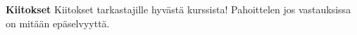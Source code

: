 \documentclass[12pt,a4paper,leqno]{amsart}
\begin{document}
\textbf{Kiitokset}
Kiitokset tarkastajille hyvästä kurssista! Pahoittelen jos vastauksissa on mitään epäselvyyttä.
\begin{comment}
g saa pienimmän ja suurimman arvonsa välillä $[min(x_{min}, b_\min), ]$




Tarkastellaan eri tapauksia:
\begin{align*}
    a > d, b > c, a - d > 0, b - c > 0 \\
    a < d 
    a = d
    b > c
    b < c 
    b = c, b - c = 0
\end{align*}

Jos 

Toisaalta koska funktiot $f(x)$ ja $f(-x)$ saavuttavat myös joissain pisteissä suurimman ja pienimmän arvon.
\end{comment}
\bigskip
\begin{comment}
\underbar{Tulkinta}: tapauksessa $n=2$ maapallolla on joka hetki kaksi 
vastakkaista pistettä, joissa on sama lämpötila (tai sama ilmanpaine).
\textit{Lisätieto}: (\textit{Borsuk-Ulamin} lause) tulos pätee kaikille jatkuville kuvauksille $f: S^n \to \mathbb R^n$. 

Kaikissa tehtävissä vastaukset tulee \textbf{perustella}. Pelkkä vastaus ei riitä pisteisiin, ellei tehtävässä erityisesti niin mainita.
Tehtävien arvostelussa käytetään seuraavaa asteikkoa: 
\begin{itemize}
\item [0 p.] Ei ratkaisua tai ratkaisussa ei oikeita elementtejä.
\item [1 p.] Ratkaisussa oikeita elementtejä, mutta kokonaisuutena puutteellinen tai vain osa tehtävästä on ratkaistu.
\item [2 p.] Ratkaisu (lähes) oikein.
\end{itemize}
\end{comment}
\end{document}
